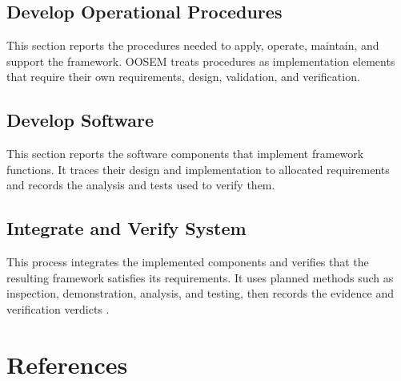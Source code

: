 \documentclass[11pt,a4paper]{article}
\begin{document}
\subsection{Develop Operational Procedures}
This section reports the procedures needed to apply, operate, maintain, and support the framework. OOSEM treats procedures as implementation elements that require their own requirements, design, validation, and verification.

\subsection{Develop Software}
This section reports the software components that implement framework functions. It traces their design and implementation to allocated requirements and records the analysis and tests used to verify them.

\subsection{Integrate and Verify System}
\label{subsection:integrate-and-verify-system}
This process integrates the implemented components and verifies that the resulting framework satisfies its requirements. It uses planned methods such as inspection, demonstration, analysis, and testing, then records the evidence and verification verdicts \citep{friedenthal2014practical}.

\section{References}


\end{document}
